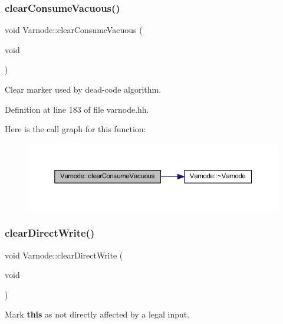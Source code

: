 \subsubsection{\texorpdfstring{clearConsumeVacuous()}{clearConsumeVacuous()}}
{\footnotesize\ttfamily void Varnode\+::clear\+Consume\+Vacuous (\begin{DoxyParamCaption}\item[{void}]{ }\end{DoxyParamCaption})\hspace{0.3cm}{\ttfamily [inline]}}



Clear marker used by dead-\/code algorithm. 



Definition at line 183 of file varnode.\+hh.

Here is the call graph for this function\+:
\nopagebreak
\begin{figure}[H]
\begin{center}
\leavevmode
\includegraphics[width=350pt]{class_varnode_a71bc569e459e904cd199c89340a212e0_cgraph}
\end{center}
\end{figure}
\mbox{\label{class_varnode_a5f2388a48093153cbe4726a582fb93b0}} 
\subsubsection{\texorpdfstring{clearDirectWrite()}{clearDirectWrite()}}
{\footnotesize\ttfamily void Varnode\+::clear\+Direct\+Write (\begin{DoxyParamCaption}\item[{void}]{ }\end{DoxyParamCaption})\hspace{0.3cm}{\ttfamily [inline]}}



Mark {\bfseries{this}} as not directly affected by a legal input. 




